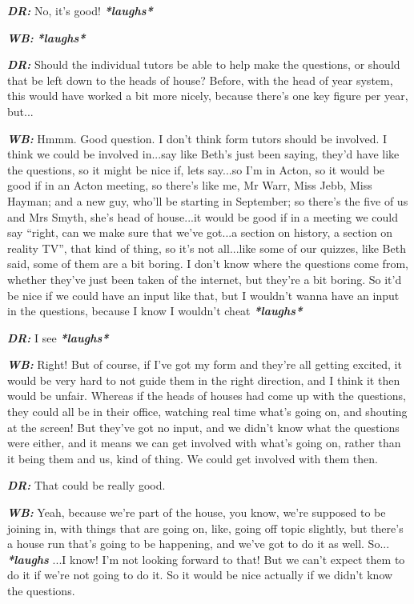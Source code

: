 \textit{\textbf{DR:}} No, it's good! \textit{\textbf{*laughs*}}

\textit{\textbf{WB:}} \textit{\textbf{*laughs*}}

\textit{\textbf{DR:}} Should the individual tutors be able to help make the questions, or should that be left down to the heads of house? Before, with the head of year system, this would have worked a bit more nicely, because there's one key figure per year, but...

\textit{\textbf{WB:}} Hmmm. Good question. I don't think form tutors should be involved. I think we could be involved in...say like Beth's just been saying, they'd have like the questions, so it might be nice if, lets say...so I'm in Acton, so it would be good if in an Acton meeting, so there's like me, Mr Warr, Miss Jebb, Miss Hayman; and a new guy, who'll be starting in September; so there's the five of us and Mrs Smyth, she's head of house...it would be good if in a meeting we could say ``right, can we make sure that we've got...a section on history, a section on reality TV'', that kind of thing, so it's not all...like some of our quizzes, like Beth said, some of them are a bit boring. I don't know where the questions come from, whether they've just been taken of the internet, but they're a bit boring. So it'd be nice if we could have an input like that, but I wouldn't wanna have an input in the questions, because I know I wouldn't cheat \textit{\textbf{*laughs*}}

\textit{\textbf{DR:}} I see \textit{\textbf{*laughs*}}

\textit{\textbf{WB:}} Right! But of course, if I've got my form and they're all getting excited, it would be very hard to not guide them in the right direction, and I think it then would be unfair. Whereas if the heads of houses had come up with the questions, they could all be in their office, watching real time what's going on, and shouting at the screen! But they've got no input, and we didn't know what the questions were either, and it means we can get involved with what's going on, rather than it being them and us, kind of thing. We could get involved with them then.

\textit{\textbf{DR:}} That could be really good.

\textit{\textbf{WB:}} Yeah, because we're part of the house, you know, we're supposed to be joining in, with things that are going on, like, going off topic slightly, but there's a house run that's going to be happening, and we've got to do it as well. So... \textit{\textbf{*laughs}} ...I know! I'm not looking forward to that! But we can't expect them to do it if we're not going to do it. So it would be nice actually if we didn't know the questions.

